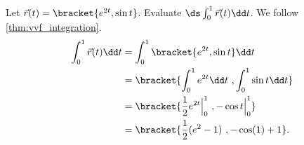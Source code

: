 \begin{example}\label{ex_vvfint1}%
Let $\vec r(t) =\bracket{e^{2t},\sin t}$. Evaluate $\ds \int_0^1 \vec r(t) \dd t$.
\solution
We follow \autoref{thm:vvf_integration}.
\begin{align*}
\int_0^1 \vec r(t) \dd t &= \int_0^1\bracket{e^{2t},\sin t}\dd t \\
				&=\bracket{\int_0^1 e^{2t}\dd t\ , \int_0^1 \sin t \dd t}\\
				&=\bracket{\frac12e^{2t}\Big|_0^1\ , -\cos t\Big|_0^1}\\
				&=\bracket{\frac12(e^2-1)\ , -\cos(1)+1}
				.
\end{align*}
\end{example}

